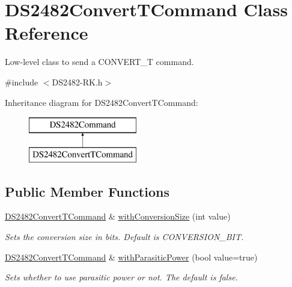\hypertarget{class_d_s2482_convert_t_command}{}\section{D\+S2482\+Convert\+T\+Command Class Reference}
\label{class_d_s2482_convert_t_command}


Low-\/level class to send a C\+O\+N\+V\+E\+R\+T\+\_\+T command.  




{\ttfamily \#include $<$D\+S2482-\/\+R\+K.\+h$>$}

Inheritance diagram for D\+S2482\+Convert\+T\+Command\+:\begin{figure}[H]
\begin{center}
\leavevmode
\includegraphics[height=2.000000cm]{class_d_s2482_convert_t_command}
\end{center}
\end{figure}
\subsection*{Public Member Functions}
\begin{DoxyCompactItemize}
\item 
\mbox{\hyperlink{class_d_s2482_convert_t_command}{D\+S2482\+Convert\+T\+Command}} \& \mbox{\hyperlink{class_d_s2482_convert_t_command_a1813c4f607fceab23e6cd1797db8cf8f}{with\+Conversion\+Size}} (int value)
\begin{DoxyCompactList}\small\item\em Sets the conversion size in bits. Default is C\+O\+N\+V\+E\+R\+S\+I\+O\+N\+\_\+B\+IT. \end{DoxyCompactList}\item 
\mbox{\label{class_d_s2482_convert_t_command_aef705b42ffe4a90f35ddc11ca713893a}} 
\mbox{\hyperlink{class_d_s2482_convert_t_command}{D\+S2482\+Convert\+T\+Command}} \& \mbox{\hyperlink{class_d_s2482_convert_t_command_aef705b42ffe4a90f35ddc11ca713893a}{with\+Parasitic\+Power}} (bool value=true)
\begin{DoxyCompactList}\small\item\em Sets whether to use parasitic power or not. The default is false. \end{DoxyCompactList}\end{DoxyCompactItemize}
